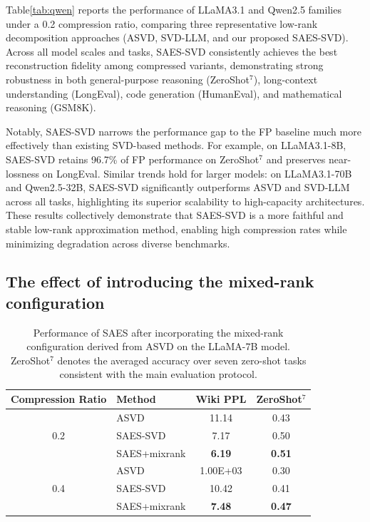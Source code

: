 Table\ref{tab:qwen} reports the performance of LLaMA3.1 and Qwen2.5 families under a 0.2 compression ratio, comparing three representative low-rank decomposition approaches (ASVD, SVD-LLM, and our proposed SAES-SVD). Across all model scales and tasks, SAES-SVD consistently achieves the best reconstruction fidelity among compressed variants, demonstrating strong robustness in both general-purpose reasoning (ZeroShot$^{7}$), long-context understanding (LongEval), code generation (HumanEval), and mathematical reasoning (GSM8K).

Notably, SAES-SVD narrows the performance gap to the FP baseline much more effectively than existing SVD-based methods. For example, on LLaMA3.1-8B, SAES-SVD retains 96.7\% of FP performance on ZeroShot$^{7}$ and preserves near-lossness on LongEval. Similar trends hold for larger models: on LLaMA3.1-70B and Qwen2.5-32B, SAES-SVD significantly outperforms ASVD and SVD-LLM across all tasks, highlighting its superior scalability to high-capacity architectures.
These results collectively demonstrate that SAES-SVD is a more faithful and stable low-rank approximation method, enabling high compression rates while minimizing degradation across diverse benchmarks.

\subsection{The effect of introducing the mixed-rank configuration}

\begin{table}[h]
\centering
\caption{{Performance of SAES after incorporating the mixed-rank configuration derived from ASVD on the LLaMA-7B model. ZeroShot$^7$ denotes the averaged accuracy over seven zero-shot tasks consistent with the main evaluation protocol.}}
\label{tab:mixrank}
\begin{tabular}{c l c c}
\toprule
\textbf{Compression Ratio} & \textbf{Method} & \textbf{Wiki PPL} & \textbf{ZeroShot$^7$} \\
\midrule
\multirow{3}{*}{0.2}
& ASVD          & 11.14     & 0.43 \\
& SAES-SVD      & 7.17      & 0.50 \\
& SAES+mixrank  & \textbf{6.19} & \textbf{0.51} \\
\midrule
\multirow{3}{*}{0.4}
& ASVD          & 1.00E+03  & 0.30 \\
& SAES-SVD      & 10.42     & 0.41 \\
& SAES+mixrank  & \textbf{7.48} & \textbf{0.47} \\
\bottomrule
\end{tabular}
\end{table}


